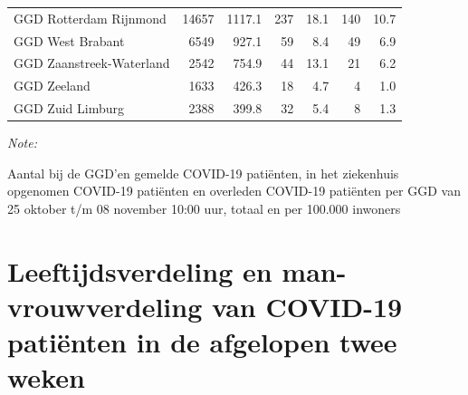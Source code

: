\documentclass[
  english,
  man,floatsintext]{apa6}
\begin{document}
\begin{table}[H]
\begin{threeparttable}
\begin{tabular}{lrrrrrr}
GGD Rotterdam Rijnmond & 14657 & 1117.1 & 237 & 18.1 & 140 & 10.7\\
GGD West Brabant & 6549 & 927.1 & 59 & 8.4 & 49 & 6.9\\
GGD Zaanstreek-Waterland & 2542 & 754.9 & 44 & 13.1 & 21 & 6.2\\
GGD Zeeland & 1633 & 426.3 & 18 & 4.7 & 4 & 1.0\\
GGD Zuid Limburg & 2388 & 399.8 & 32 & 5.4 & 8 & 1.3\\
\bottomrule
\end{tabular}
\begin{tablenotes}
\item \textit{Note: } 
\item Aantal bij de GGD’en gemelde COVID-19 patiënten, in het ziekenhuis opgenomen COVID-19 patiënten en overleden COVID-19 patiënten per GGD van 25 oktober t/m 08 november 10:00 uur, totaal en per 100.000 inwoners
\end{tablenotes}
\end{threeparttable}
\endgroup{}
\end{table}

\newpage

\hypertarget{leeftijdsverdeling-en-man-vrouwverdeling-van-covid-19-patiuxebnten-in-de-afgelopen-twee-weken}{%
\section{Leeftijdsverdeling en man-vrouwverdeling van COVID-19 patiënten in de afgelopen twee weken}\label{leeftijdsverdeling-en-man-vrouwverdeling-van-covid-19-patiuxebnten-in-de-afgelopen-twee-weken}}
\end{document}
